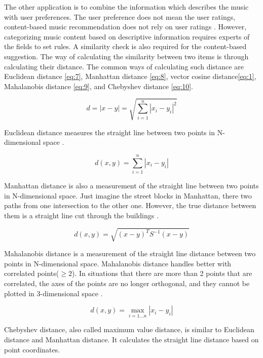 The other application is to combine the information which describes the music with user preferences. The user preference does not mean the user ratings, content-based music recommendation does not rely on user ratings \cite{Celma2010}. However, categorizing music content based on descriptive information requires experts of the fields to set rules. A similarity check is also required for the content-based suggestion. The way of calculating the similarity between two items is through calculating their distance. The common ways of calculating such distance are Euclidean distance \eqref{eq:7}, Manhattan distance \eqref{eq:8}, vector cosine distance\eqref{eq:1}, Mahalanobis distance \eqref{eq:9}, and Chebyshev distance \eqref{eq:10}.

\begin{equation}
  d=|x-y|=\sqrt{\sum_{i=1}^{n}\left|x_{i}-y_{i}\right|^{2}}
  \label{eq:7}
\end{equation}

Euclidean distance measures the straight line between two points in N-dimensional space \cite{euclidean}.

\begin{equation}
  d(x, y)=\sum_{i=1}^{n}\left|x_{i}-y_{i}\right|
  \label{eq:8}
\end{equation}

Manhattan distance is also a measurement of the straight line between two points in N-dimensional space. Just imagine the street blocks in Manhattan, there two paths from one intersection to the other one. However, the true distance between them is a straight line cut through the buildings \cite{craw1970}.

\begin{equation}
  d(x, y)=\sqrt{(x-y)^{T} S^{-1}(x-y)}
  \label{eq:9}
\end{equation}

Mahalanobis distance is a measurement of the straight line distance between two points in N-dimensional space. Mahalanobis distance handles better with correlated points($\ge2$). In situations that there are more than 2 points that are correlated, the axes of the points are no longer orthogonal, and they cannot be plotted in 3-dimensional space \cite{stephanie2018}.

\begin{equation}
  d(x, y)=\max _{i=1 . . . n}\left|x_{i}-y_{i}\right|
  \label{eq:10}
\end{equation}

Chebyshev distance, also called maximum value distance, is similar to Euclidean distance and Manhattan distance. It calculates the straight line distance based on point coordinates.

